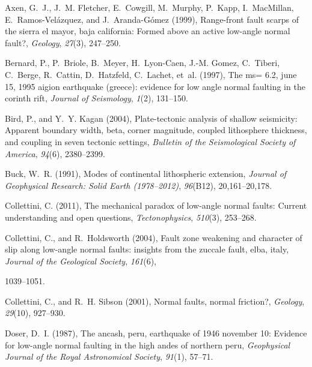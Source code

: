 \documentclass[twocolumn,grl]{AGUTeX}
\begin{document}
\begin{article}
\begin{thebibliography}{28}
Axen, G.~J., J.~M. Fletcher, E.~Cowgill, M.~Murphy, P.~Kapp, I.~MacMillan,
  E.~Ramos-Vel{\'a}zquez, and J.~Aranda-G{\'o}mez (1999), Range-front fault
  scarps of the sierra el mayor, baja california: Formed above an active
  low-angle normal fault?, \textit{Geology}, \textit{27}(3), 247--250.

Bernard, P., P.~Briole, B.~Meyer, H.~Lyon-Caen, J.-M. Gomez, C.~Tiberi,
  C.~Berge, R.~Cattin, D.~Hatzfeld, C.~Lachet, et~al. (1997), The ms= 6.2, june
  15, 1995 aigion earthquake (greece): evidence for low angle normal faulting
  in the corinth rift, \textit{Journal of Seismology}, \textit{1}(2), 131--150.

Bird, P., and Y.~Y. Kagan (2004), Plate-tectonic analysis of shallow
  seismicity: Apparent boundary width, beta, corner magnitude, coupled
  lithosphere thickness, and coupling in seven tectonic settings,
  \textit{Bulletin of the Seismological Society of America}, \textit{94}(6),
  2380--2399.

Buck, W.~R. (1991), Modes of continental lithospheric extension,
  \textit{Journal of Geophysical Research: Solid Earth (1978--2012)},
  \textit{96}(B12), 20,161--20,178.

Collettini, C. (2011), The mechanical paradox of low-angle normal faults:
  Current understanding and open questions, \textit{Tectonophysics},
  \textit{510}(3), 253--268.

Collettini, C., and R.~Holdsworth (2004), Fault zone weakening and character of
  slip along low-angle normal faults: insights from the zuccale fault, elba,
  italy, \textit{Journal of the Geological Society}, \textit{161}(6),

  1039--1051.

Collettini, C., and R.~H. Sibson (2001), Normal faults, normal friction?,
  \textit{Geology}, \textit{29}(10), 927--930.

Doser, D.~I. (1987), The ancash, peru, earthquake of 1946 november 10: Evidence
  for low-angle normal faulting in the high andes of northern peru,
  \textit{Geophysical Journal of the Royal Astronomical Society},
  \textit{91}(1), 57--71.


\end{thebibliography}
\end{article}
\end{document}
